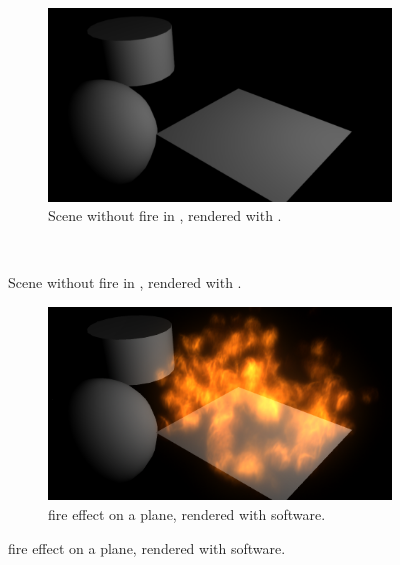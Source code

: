 \begin{figure}[htpb!]
        \centering
        \begin{subfigure}[t]{\textwidth}
                \includegraphics[width=\textwidth]{img/maya_no_fire_mental_ray}
                \caption{Scene without fire in \Maya, rendered with \MentalRay.}
                 \label{fig:maya_no_fire_mental_ray}
        \end{subfigure}    
        \\     
\end{figure}

\begin{figure}[htpb!]
		\ContinuedFloat
		\begin{subfigure}[t]{\textwidth}
                \includegraphics[width=\textwidth]{img/maya_fire}
                \caption{\Maya fire effect on a plane, rendered with \Maya software.}
                \label{fig:maya_fire}
        \end{subfigure}%
\end{figure}

